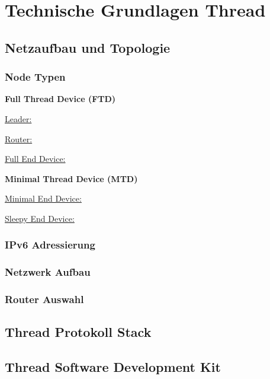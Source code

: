 \clearpage
\section{Technische Grundlagen Thread}\label{sec:TechnischeGrundlagenThread}

\subsection{Netzaufbau und Topologie}\label{subsec:NetzaufbauundTopologie}
\subsubsection{Node Typen}\label{subsubsec:NodeTypen}
\textbf{Full Thread Device (FTD)}

\underline{Leader:}

\underline{Router:}

\underline{Full End Device:}

\textbf{Minimal Thread Device (MTD)}

\underline{Minimal End Device:}

\underline{Sleepy End Device:}

\subsubsection{IPv6 Adressierung}\label{subsubsec:IPv6Adressierung}

\subsubsection{Netzwerk Aufbau}\label{subsubsec:NetzwerkAufbau}

\subsubsection{Router Auswahl}\label{subsubsec:RouterAuswahl}

\subsection{Thread Protokoll Stack}\label{subsec:ThreadProtokollStack}

\subsection{Thread Software Development Kit}\label{subsec:ThreadSoftwareDevelopmentKit}
